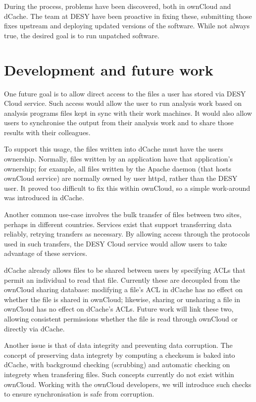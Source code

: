 \documentclass[a4paper]{jpconf}
\begin{document}
During the process, problems have been discovered, both in ownCloud
and dCache.  The team at DESY have been proactive in fixing these,
submitting those fixes upstream and deploying updated versions of the
software.  While not always true, the desired goal is to run unpatched
software.


\section{Development and future work}

One future goal is to allow direct access to the files a user has
stored via DESY Cloud service.  Such access would allow the user to
run analysis work based on analysis programs files kept in sync with
their work machines.  It would also allow users to synchronise the
output from their analysis work and to share those results with their
colleagues.

To support this usage, the files written into dCache must have the
users ownership.  Normally, files written by an application have that
application's ownership; for example, all files written by the Apache
daemon (that hosts ownCloud service) are normally owned by user httpd,
rather than the DESY user.  It proved too difficult to fix this within
ownCloud, so a simple work-around was introduced in dCache.

Another common use-case involves the bulk transfer of files between
two sites, perhaps in different countries.  Services
exist\cite{fts}\cite{globus} that support transferring data reliably,
retrying transfers as necessary.  By allowing access through the
protocols used in such transfers, the DESY Cloud service would allow
users to take advantage of these services.

dCache already allows files to be shared between users by specifying
ACLs that permit an individual to read that file.  Currently these are
decoupled from the ownCloud sharing database: modifying a file's ACL
in dCache has no effect on whether the file is shared in ownCloud;
likewise, sharing or unsharing a file in ownCloud has no effect on
dCache's ACLs.  Future work will link these two, allowing consistent
permissions whether the file is read through ownCloud or directly via
dCache.

Another issue is that of data integrity and preventing data
corruption.  The concept of preserving data integrety by computing a
checksum is baked into dCache, with background checking (scrubbing)
and automatic checking on integrety when transfering files.  Such
concepts currently do not exist within ownCloud.  Working with the
ownCloud developers, we will introduce such checks to ensure
synchronisation is safe from corruption.
\end{document}
